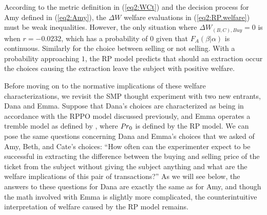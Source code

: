 \documentclass[../main.tex]{subfiles}
\begin{document}
According to the metric definition in (\ref{eq2:WCt}) and the decision process for Amy defined in (\ref{eq2:Amy}), the $\Delta W$ welfare evaluations in (\ref{eq2:RP.welfare}) must be weak inequalities.
However, the only situation where $\Delta W_{(B,C),\mathit{Buy}} = 0$ is when $r=-0.0232$, which has a probability of $0$ given that $F_A(\beta|\alpha)$ is continuous.
Similarly for the choice between selling or not selling.
With a probability approaching $1$, the RP model predicts that should an extraction occur the choices causing the extraction leave the subject with positive welfare.

Before moving on to the normative implications of these welfare characterizations, we revisit the SMP thought experiment with two new entrants, Dana and Emma.
Suppose that Dana's choices are characterized as being in accordance with the RPPO model discussed previously, and Emma operates a tremble model as defined by \textcite{Loomes2002}, where $ {\mathit{Pr}}_0$ is defined by the RP model.
We can pose the same questions concerning Dana and Emma's choices that we asked of Amy, Beth, and Cate's choices: \enquote{How often can the experimenter expect to be successful in extracting the difference between the buying and selling price of the ticket from the subject without giving the subject anything and what are the welfare implications of this pair of transactions?}
As we will see below, the answers to these questions for Dana are exactly the same as for Amy, and though the math involved with Emma is slightly more complicated, the counterintuitive interpretation of welfare caused by the RP model remains.
\end{document}
